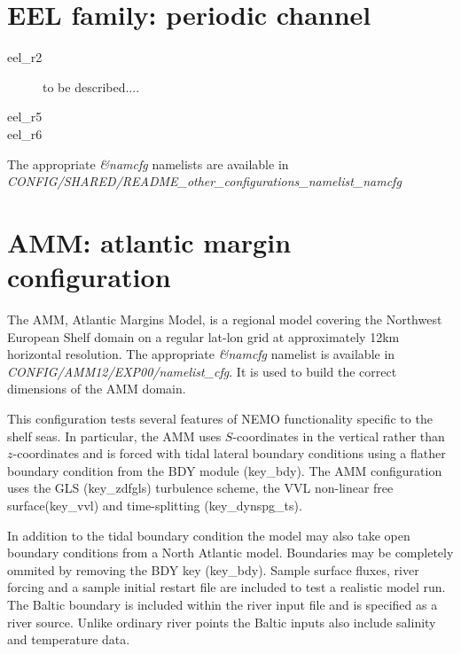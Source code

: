 \documentclass[NEMO_book]{subfiles}
\begin{document}
\section{EEL family: periodic channel}
\label{MISC_config_EEL}

\begin{description}
\item[eel\_r2]  to be described....
\item[eel\_r5]  
\item[eel\_r6]  
\end{description}
The appropriate \textit{\&namcfg} namelists are available in  
\textit{CONFIG/SHARED/README\_other\_configurations\_namelist\_namcfg}
\section{AMM: atlantic margin configuration }
\label{MISC_config_AMM}

The AMM, Atlantic Margins Model, is a regional model covering the
Northwest European Shelf domain on a regular lat-lon grid at
approximately 12km horizontal resolution. The appropriate 
\textit{\&namcfg} namelist  is available in \textit{CONFIG/AMM12/EXP00/namelist\_cfg}.
It is used to build the correct dimensions of the AMM domain.

This configuration tests several features of NEMO functionality specific
to the shelf seas.
In particular, the AMM uses $S$-coordinates in the vertical rather than
$z$-coordinates and is forced with tidal lateral boundary conditions
using a flather boundary condition from the BDY module (key\_bdy).
The AMM configuration  uses the GLS (key\_zdfgls) turbulence scheme, the
VVL non-linear free surface(key\_vvl) and time-splitting
(key\_dynspg\_ts).

In addition to the tidal boundary condition the model may also take
open boundary conditions from a North Atlantic model. Boundaries may be
completely ommited by removing the BDY key (key\_bdy).
Sample surface fluxes, river forcing and a sample initial restart file
are included to test a realistic model run. The Baltic boundary is
included within the river input file and is specified as a river source.
Unlike ordinary river points the Baltic inputs also include salinity and
temperature data.
\end{document}
